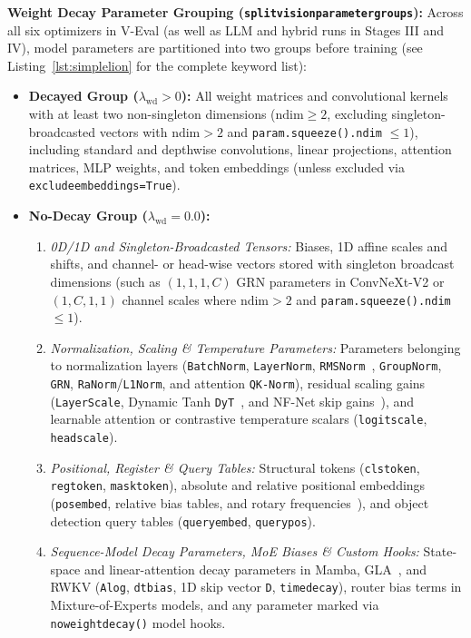 \documentclass[11pt,a4paper]{article}
\renewcommand{\_}{\origunderscore\allowbreak}
\begin{document}
\noindent
\textbf{Weight Decay Parameter Grouping (\texttt{split\_vision\_parameter\_groups}):} Across all six optimizers in V-Eval (as well as LLM and hybrid runs in Stages III and IV), model parameters are partitioned into two groups before training (see Listing~\ref{lst:simplelion} for the complete keyword list):
\begin{itemize}[leftmargin=1.8em, itemsep=0.35em]
    \item \textbf{Decayed Group ($\lambda_{\text{wd}} > 0$):} All weight matrices and convolutional kernels with at least two non-singleton dimensions ($\text{ndim} \ge 2$, excluding singleton-broadcasted vectors with $\text{ndim} > 2$ and \texttt{param.squeeze().ndim} $\le 1$), including standard and depthwise convolutions, linear projections, attention matrices, MLP weights, and token embeddings (unless excluded via \texttt{exclude\_embeddings=True}).
    \item \textbf{No-Decay Group ($\lambda_{\text{wd}} = 0.0$):}
    \begin{enumerate}[label=(\alph*), leftmargin=1.8em, itemsep=0.25em]
        \item \textit{0D/1D and Singleton-Broadcasted Tensors:} Biases, 1D affine scales and shifts, and channel- or head-wise vectors stored with singleton broadcast dimensions (such as $(1, 1, 1, C)$ GRN parameters in ConvNeXt-V2 or $(1, C, 1, 1)$ channel scales where $\text{ndim} > 2$ and \texttt{param.squeeze().ndim} $\le 1$).
        \item \textit{Normalization, Scaling \& Temperature Parameters:} Parameters belonging to normalization layers (\texttt{BatchNorm}, \texttt{LayerNorm}, \texttt{RMSNorm}~\cite{zhang2019rmsnorm}, \texttt{GroupNorm}, \texttt{GRN}, \texttt{RaNorm}/\texttt{L1Norm}, and attention \texttt{QK-Norm}), residual scaling gains (\texttt{LayerScale}, Dynamic Tanh \texttt{DyT}~\cite{zhu2025dyt}, and NF-Net skip gains~\cite{brock2021nfnet}), and learnable attention or contrastive temperature scalars (\texttt{logit\_scale}, \texttt{head\_scale}).
        \item \textit{Positional, Register \& Query Tables:} Structural tokens (\texttt{cls\_token}, \texttt{reg\_token}, \texttt{mask\_token}), absolute and relative positional embeddings (\texttt{pos\_embed}, relative bias tables, and rotary frequencies~\cite{su2024roformer}), and object detection query tables (\texttt{query\_embed}, \texttt{query\_pos}).
        \item \textit{Sequence-Model Decay Parameters, MoE Biases \& Custom Hooks:} State-space and linear-attention decay parameters in Mamba, GLA~\cite{yang2024gla}, and RWKV (\texttt{A\_log}, \texttt{dt\_bias}, 1D skip vector \texttt{D}, \texttt{time\_decay}), router bias terms in Mixture-of-Experts models, and any parameter marked via \texttt{no\_weight\_decay()} model hooks.
    \end{enumerate}
\end{itemize}
\end{document}
